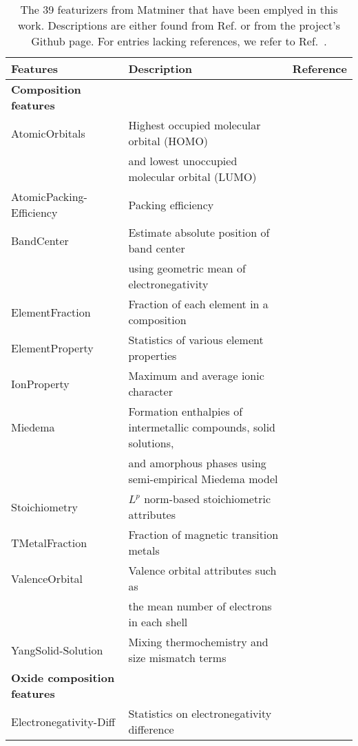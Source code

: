 \begin{center}
\begin{longtable}{M{3.5cm} M{6.5cm} M{2.0cm}}
\caption{The 39 featurizers from Matminer that have been emplyed in this work. Descriptions are either found from Ref. \cite{Ward2018} or from the project's Github page. For entries lacking references, we refer to Ref.~\cite{Ward2018}.}
\label{table:featurizers} 
\\ \hline
Features & Description & Reference \\
\hline 
  \textbf{Composition features} & & \\ 
  AtomicOrbitals & Highest occupied molecular orbital (HOMO) & \cite{Kotochigova1997}  \\   
   & and lowest unoccupied molecular orbital (LUMO) &  \\   
  AtomicPacking-Efficiency & Packing efficiency & \cite{Laws2015}  \\   
  BandCenter & Estimate absolute position of band center  & \cite{Butler1978} \\   
   & using geometric mean of electronegativity &  \\  
  ElementFraction & Fraction of each element in a composition &    \\   
  ElementProperty & Statistics of various element properties & \cite{Ong2013,Ward2016, Deml2016}  \\   
  IonProperty & Maximum and average ionic character & \cite{Ward2016} \\   
  Miedema & Formation enthalpies of intermetallic compounds, solid solutions, & \cite{Weeber1987} \\   
   & and amorphous phases using semi-empirical Miedema model &  \\   
  Stoichiometry & $L^p$ norm-based stoichiometric attributes & \cite{Ward2016} \\   
  TMetalFraction & Fraction of magnetic transition metals & \cite{Deml2016}  \\   
  ValenceOrbital & Valence orbital attributes such as & \cite{Ward2016}  \\   
   &  the mean number of electrons in each shell &   \\   
  YangSolid-Solution & Mixing thermochemistry and size mismatch terms & \cite{Yang2012} \\
    \hline 
  \textbf{Oxide composition features} &  &  \\
  Electronegativity-Diff & Statistics on electronegativity difference & \cite{Deml2016} \\   

\end{longtable}
\end{center}
